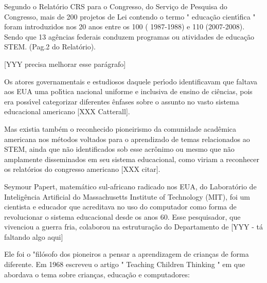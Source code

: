\documentclass[
12pt,		%
openright,	%
twoside,  %
a4paper,			%
chapter=TITLE,		%
english,			%
french,				%
spanish,			%
brazil				%
]{USPSC-classe/USPSC}
\begin{document}
Segundo o Relat\'orio CRS para o Congresso, do Servi\c{c}o de Pesquisa do Congresso, mais de 200 projetos de Lei contendo o termo " educa\c{c}\~ao cient\'{\i}fica " foram introduzidos nos 20 anos entre os 100 ( 1987-1988) e 110 (2007-2008). Sendo que 13 ag\^encias federais conduzem programas ou atividades de educa\c{c}\~ao STEM. (Pag.2 do Relat\'orio). 


[YYY precisa melhorar esse par\'agrafo]


Os atores governamentais e estudiosos daquele per\'{\i}odo identificavam que faltava aos EUA uma pol\'{\i}tica nacional uniforme e inclusiva de ensino de ci\^encias, pois era poss\'{\i}vel categorizar diferentes \^enfases sobre o assunto no vasto sistema educacional americano [XXX Catterall].


Mas existia tamb\'em o reconhecido pioneirismo da comunidade acad\^emica americana nos m\'etodos voltados para o aprendizado de temas relacionados ao STEM, ainda que n\~ao identificados sob esse acr\^onimo ou mesmo que n\~ao amplamente disseminados em seu sistema educacional, como viriam a reconhecer os relat\'orios do congresso americano [XXX citar]. 


Seymour Papert, matem\'atico sul-africano radicado nos EUA, do Laborat\'orio de Intelig\^encia Artificial do Massachusetts Institute of Technology (MIT), foi um  cientista e educador que acreditava  no  uso do computador como forma de revolucionar o sistema  educacional  desde os anos 60. Esse pesquisador, que vivenciou a guerra fria, colaborou na estrutura\c{c}\~ao do Departamento de  [YYY - t\'a faltando algo aqui]


Ele foi o "fil\'osofo dos pioneiros a pensar a aprendizagem de crian\c{c}as de forma diferente. Em 1968 escreveu o artigo " Teaching Children Thinking "  em que abordava  o tema sobre crian\c{c}as, educa\c{c}\~ao e computadores: 
\end{document}
